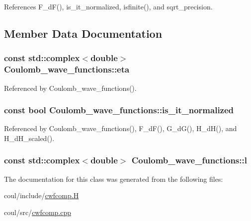 References F\-\_\-d\-F(), is\-\_\-it\-\_\-normalized, isfinite(), and sqrt\-\_\-precision.



\subsection{Member Data Documentation}
\hypertarget{classCoulomb__wave__functions_a944d6723016c4c50ad7a9b55d62a0131}{
\subsubsection[{eta}]{\setlength{\rightskip}{0pt plus 5cm}const {\bf std\-::complex}$<$double$>$ Coulomb\-\_\-wave\-\_\-functions\-::eta}}\label{classCoulomb__wave__functions_a944d6723016c4c50ad7a9b55d62a0131}


Referenced by Coulomb\-\_\-wave\-\_\-functions().

\hypertarget{classCoulomb__wave__functions_a11b791087220f0194b2750d36946392e}{
\subsubsection[{is\-\_\-it\-\_\-normalized}]{\setlength{\rightskip}{0pt plus 5cm}const bool Coulomb\-\_\-wave\-\_\-functions\-::is\-\_\-it\-\_\-normalized}}\label{classCoulomb__wave__functions_a11b791087220f0194b2750d36946392e}


Referenced by Coulomb\-\_\-wave\-\_\-functions(), F\-\_\-d\-F(), G\-\_\-d\-G(), H\-\_\-d\-H(), and H\-\_\-d\-H\-\_\-scaled().

\hypertarget{classCoulomb__wave__functions_a184f08ca7adeb5d334b72dc354777a64}{
\subsubsection[{l}]{\setlength{\rightskip}{0pt plus 5cm}const {\bf std\-::complex}$<$double$>$ Coulomb\-\_\-wave\-\_\-functions\-::l}}\label{classCoulomb__wave__functions_a184f08ca7adeb5d334b72dc354777a64}


The documentation for this class was generated from the following files\-:\begin{DoxyCompactItemize}
\item 
coul/include/\hyperlink{cwfcomp_8H}{cwfcomp.\-H}\item 
coul/src/\hyperlink{cwfcomp_8cpp}{cwfcomp.\-cpp}\end{DoxyCompactItemize}
